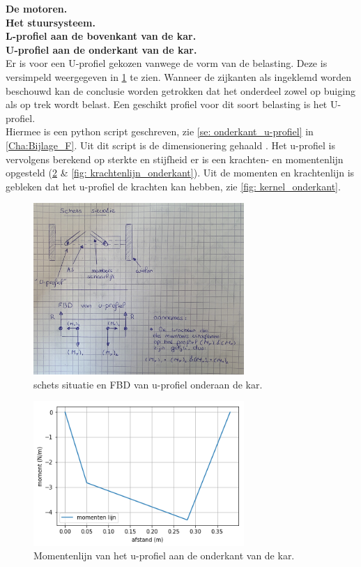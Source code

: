 \textbf{De motoren.}\\

\textbf{Het stuursysteem.}\\

\textbf{L-profiel aan de bovenkant van de kar.}\\

\textbf{U-profiel aan de onderkant van de kar.}\\
Er is voor een U-profiel gekozen vanwege de vorm van de belasting. Deze is versimpeld weergegeven in \cref{fig: schets_FBD_uprofiel} te zien. Wanneer de zijkanten als ingeklemd worden beschouwd kan de conclusie worden getrokken dat het onderdeel zowel op buiging als op trek wordt belast. Een geschikt profiel voor dit soort belasting is het U-profiel.\\
Hiermee is een python script geschreven, zie \cref{se: onderkant_u-profiel} in \cref{Cha:Bijlage_F}. Uit dit script is de dimensionering gehaald%
. Het u-profiel is vervolgens berekend op sterkte en stijfheid er is een krachten- en momentenlijn opgesteld (\cref{fig: momentenlijn_onderkant} \& \cref{fig: krachtenlijn_onderkant}). Uit de momenten en krachtenlijn is gebleken dat het u-profiel de krachten kan hebben, zie \cref{fig: kernel_onderkant}.

\begin{figure}[H]
    \includegraphics[width = 80mm]{04_conceptdimensionering/U-profiel_tekening.jpg}
    \caption{schets situatie en FBD van u-profiel onderaan de kar.}
    \label{fig: schets_FBD_uprofiel}
\end{figure}
\vspace{\baselineskip}

\begin{figure}[H]
    \includegraphics[width = 80mm]{06_bijlage_F/onderkant_u_profiel/momentenlijn_onderkant.png}
    \caption{Momentenlijn van het u-profiel aan de onderkant van de kar.}
    \label{fig: momentenlijn_onderkant}
\end{figure}
\vspace{\baselineskip}

